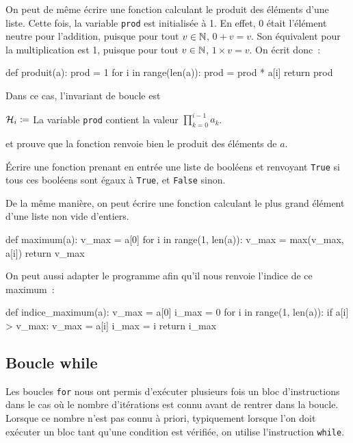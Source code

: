 \documentclass{magnoliaold}
\begin{document}
On peut de même écrire une fonction calculant le produit des éléments d'une liste. Cette fois, la variable
\verb_prod_ est initialisée à 1. En effet, 0 était l'élément neutre pour l'addition, puisque pour tout
$v\in\mathbb{N}$, $0+v=v$. Son équivalent pour la multiplication est 1, puisque pour tout $v\in\mathbb{N}$, $1\times v=v$.
On écrit donc~:
\begin{pythoncodeline}
def produit(a):
    prod = 1
    for i in range(len(a)):
        prod = prod * a[i]
    return prod
\end{pythoncodeline}
Dans ce cas, l'invariant de boucle est
\begin{center}
$\mathcal{H}_i \coloneqq$ \og La variable \verb_prod_ contient la valeur
$\displaystyle\prod_{k=0}^{i-1} a_k$. \fg
\end{center}
et prouve que la fonction renvoie bien le produit des éléments de $a$.\\

\begin{exoUnique}
\exo Écrire une fonction prenant en entrée une liste de booléens et renvoyant \verb!True! si tous ces booléens
  sont égaux à \verb_True_, et \verb!False! sinon.
\end{exoUnique}
\vspace{2ex}
De la même manière, on peut écrire une fonction calculant le plus grand élément d'une liste non vide d'entiers.

\begin{pythoncodeline}
def maximum(a):
    v_max = a[0] 
    for i in range(1, len(a)):
        v_max = max(v_max, a[i])
    return v_max
\end{pythoncodeline}

\noindent
On peut aussi adapter le programme afin qu'il nous renvoie l'indice de ce maximum~:

\begin{pythoncodeline}
def indice_maximum(a):
    v_max = a[0]
    i_max = 0
    for i in range(1, len(a)):
        if a[i] > v_max:
            v_max = a[i]
            i_max = i
    return i_max
\end{pythoncodeline}

\subsection{Boucle while}

Les boucles \verb_for_ nous ont permis d'exécuter plusieurs fois un bloc d'instructions dans
le cas où le nombre d'itérations est connu avant de rentrer dans la boucle. Lorsque ce nombre n'est pas connu à priori, typiquement lorsque l'on doit exécuter un bloc tant qu'une condition est vérifiée, on utilise l'instruction \verb_while_.\\
\end{document}
